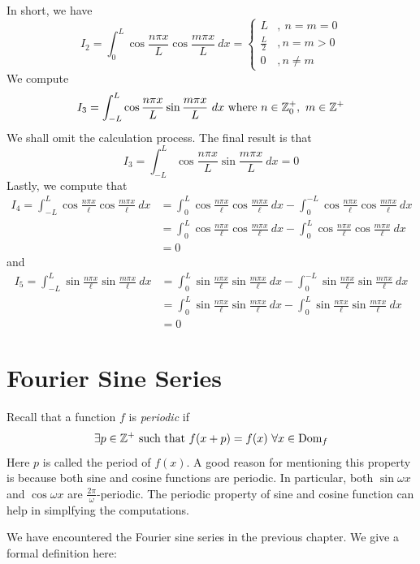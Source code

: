 In short, we have 
\[I_2 = \int_{0}^{L} \cos\frac{n\pi x}{L}\cos\frac{m\pi x}{L}\ dx = \begin{cases}
    L &,\ n=m=0\\
    \frac{L}{2} &, n=m>0\\
    0 &, n\neq m
\end{cases}\]
We compute 
\[I_3 = \int_{-L}^L \cos\frac{n\pi x}{L}\sin\frac{m\pi x}{L}\ dx \text{ where } n\in\Z^+_0,\ m\in\Z^+\]
We shall omit the calculation process. The final result is that 
\[I_3 = \int_{-L}^L \cos\frac{n\pi x}{L}\sin\frac{m\pi x}{L}\ dx = 0\]
Lastly, we compute that 
\begin{align*}
    I_4 = \int_{-L}^{L} \cos\frac{n\pi x}{\ell}\cos \frac{m\pi x}{\ell}\ dx 
    &= \int_{0}^{L} \cos\frac{n\pi x}{\ell}\cos \frac{m\pi x}{\ell}\ dx - \int_{0}^{-L} \cos\frac{n\pi x}{\ell}\cos \frac{m\pi x}{\ell}\ dx \\
    &= \int_{0}^{L} \cos\frac{n\pi x}{\ell}\cos \frac{m\pi x}{\ell}\ dx - \int_{0}^{L} \cos\frac{n\pi x}{\ell}\cos \frac{m\pi x}{\ell}\ dx\\
    &= 0
\end{align*}
and
\begin{align*}
    I_5 = \int_{-L}^{L} \sin\frac{n\pi x}{\ell}\sin \frac{m\pi x}{\ell}\ dx 
    &= \int_{0}^{L} \sin\frac{n\pi x}{\ell}\sin \frac{m\pi x}{\ell}\ dx - \int_{0}^{-L} \sin\frac{n\pi x}{\ell}\sin \frac{m\pi x}{\ell}\ dx \\
    &= \int_{0}^{L} \sin\frac{n\pi x}{\ell}\sin \frac{m\pi x}{\ell}\ dx - \int_{0}^{L} \sin\frac{n\pi x}{\ell}\sin \frac{m\pi x}{\ell}\ dx\\
    &= 0
\end{align*}

\section{Fourier Sine Series}
Recall that a function $f$ is \emph{periodic} if 
\[\exists p\in{\mathbb Z}^+ \text{ such that } f(x+p) = f(x)\ \forall x\in \operatorname{Dom}_f\]
Here $p$ is called the period of $f(x)$. A good reason for mentioning this property is because both sine and cosine functions are periodic. In particular, both $\sin \omega x$ and $\cos \omega x$ are $\frac{2\pi }{\omega}$-periodic. The periodic property of sine and cosine function can help in simplfying the computations.

We have encountered the Fourier sine series in the previous chapter. We give a formal definition here:


